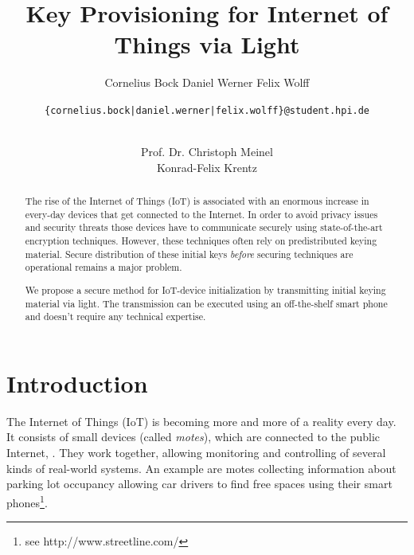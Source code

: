 \documentclass{sig-alternate} %
\begin{document}
\title{Key Provisioning for Internet of Things via Light}


\author{
\alignauthor
Cornelius Bock
%
\alignauthor
Daniel Werner
%
\alignauthor
Felix Wolff
%
\and
\texttt{\{cornelius.bock|daniel.werner|felix.wolff\}@student.hpi.de} \\ \\
\and
\alignauthor
Prof. Dr. Christoph Meinel\\
%
\alignauthor
Konrad-Felix Krentz\\
}

\maketitle

\begin{abstract}
The rise of the Internet of Things (IoT) is associated with an enormous increase in every-day devices that get connected to the Internet.
In order to avoid privacy issues and security threats those devices have to communicate securely using state-of-the-art encryption techniques.
However, these techniques often rely on predistributed keying material.
Secure distribution of these initial keys \textit{before} securing techniques are operational remains a major problem.

We propose a secure method for IoT-device initialization by transmitting initial keying material via light.
The transmission can be executed using an off-the-shelf smart phone and doesn't require any technical expertise.
\end{abstract}




\section{Introduction}
\label{sec:introduction}

The Internet of Things (IoT) is becoming more and more of a reality every day.
It consists of small devices (called \textit{motes}), which are connected to the public Internet, \cite{atzori2010internet}.
They work together, allowing monitoring and controlling of several kinds of real-world systems.
An example are motes collecting information about parking lot occupancy allowing car drivers to find free spaces using their smart phones\footnote{see http://www.streetline.com/}.
\end{document}
